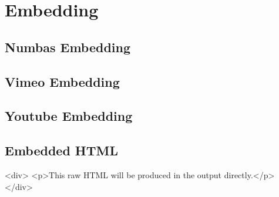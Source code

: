 \documentclass[a4paper]{report}
\begin{document}
\section{Embedding}
\subsection{Numbas Embedding}
\subsection{Vimeo Embedding}
\subsection{Youtube Embedding}

\subsection{Embedded HTML}
\begin{HTML}
    <div>
        <p>This raw HTML will be produced in the output directly.</p>
    </div>
\end{HTML}
\end{document}

